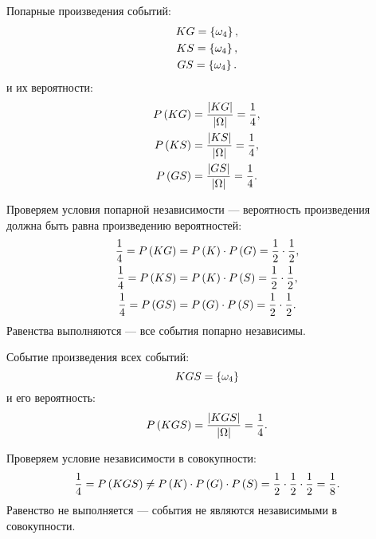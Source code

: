 Попарные произведения событий:
\begin{gather}
    KG = \left \{ \omega_4 \right \} , \\
    KS = \left \{ \omega_4 \right \} , \\
    GS = \left \{ \omega_4 \right \} .
\end{gather}
и их вероятности:
\begin{gather}
    P \left ( KG \right ) = \frac{\left | KG \right |}{\left | \Omega \right |} = \frac{1}{4} , \\
    P \left ( KS \right ) = \frac{\left | KS \right |}{\left | \Omega \right |} = \frac{1}{4} , \\
    P \left ( GS \right ) = \frac{\left | GS \right |}{\left | \Omega \right |} = \frac{1}{4} .
\end{gather}

Проверяем условия попарной независимости --- вероятность произведения должна быть равна произведению вероятностей:
\begin{gather}
    \frac{1}{4} = P \left ( KG \right ) = P \left ( K \right ) \cdot P \left ( G \right ) = \frac{1}{2} \cdot \frac{1}{2} , \\
    \frac{1}{4} = P \left ( KS \right ) = P \left ( K \right ) \cdot P \left ( S \right ) = \frac{1}{2} \cdot \frac{1}{2} , \\
    \frac{1}{4} = P \left ( GS \right ) = P \left ( G \right ) \cdot P \left ( S \right ) = \frac{1}{2} \cdot \frac{1}{2} .
\end{gather}
Равенства выполняются --- все события попарно независимы.

Событие произведения всех событий:
\begin{equation}
    KGS = \left \{ \omega_4 \right \}
\end{equation}
и его вероятность:
\begin{equation}
    P \left ( KGS \right ) = \frac{\left | KGS \right |}{\left | \Omega \right |} = \frac{1}{4} .
\end{equation}

Проверяем условие независимости в совокупности:
\begin{equation}
    \frac{1}{4} = P \left ( KGS \right ) \neq P \left ( K \right ) \cdot P \left ( G \right ) \cdot P \left ( S \right ) = \frac{1}{2} \cdot \frac{1}{2} \cdot \frac{1}{2} = \frac{1}{8} .
\end{equation}
Равенство не выполняется --- события не являются независимыми в совокупности.

